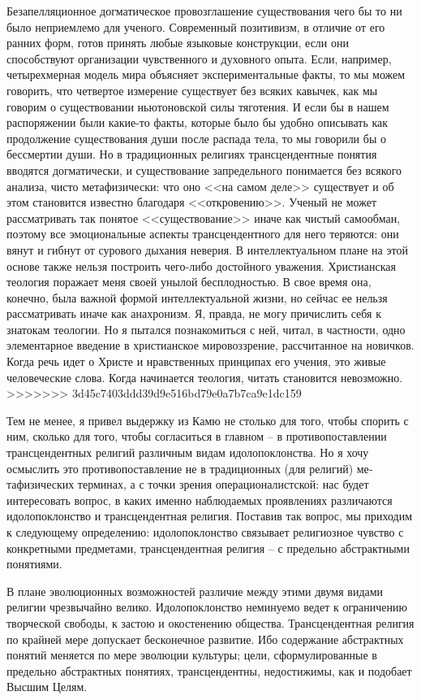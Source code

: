 \documentclass{book}
\begin{document}
Безапелляционное догматическое провозглашение существования чего бы то ни было неприемлемо для ученого. Современ­ный позитивизм, в отличие от его ранних форм, готов принять любые языковые конструкции, если они способствуют организации чувственного и духовного опыта. Если, например, четырехмерная модель мира объясняет экспериментальные факты, то мы можем говорить, что четвертое измерение существует без всяких кавычек, как мы говорим о существовании ньютоновской силы тяготения. И если бы в нашем распоряжении были какие-то факты, которые было бы удобно описывать как продолжение существования души после распада тела, то мы говорили бы о бессмертии души. Но в традиционных религиях трансцендентные понятия вводятся догматически, и существование запредельного понимается без всякого анализа, чисто метафизически: что оно <<на самом деле>> существует и об этом становится известно благодаря <<откровению>>. Уче­ный не может рассматривать так понятое <<существование>> иначе как чистый самообман, поэтому все эмоциональные 
ас­пекты трансцендентного для него теряются: они вянут и гибнут от сурового дыхания неверия. В интеллектуальном плане на этой основе также нельзя построить чего-либо достойного уважения. Христианская теология поражает меня своей уны­лой бесплодностью. В свое время она, конечно, была важной формой интеллектуальной жизни, но сейчас ее нельзя рассматривать иначе как анахронизм. Я, правда, не могу причислить себя к знатокам теологии. Но я пытался познакомиться с ней, читал, в частности, одно элементарное введение в христианское мировоззрение, рассчитанное на новичков. Когда речь идет о Христе и нравственных принципах его учения, это живые человеческие слова. Когда начинается теология, читать стано­вится невозможно.
>>>>>>> 3d45c7403ddd39d9e516bd79e0a7b7ca9e1dc159

Тем не менее, я привел выдержку из Камю не столько для того, чтобы спорить с ним, сколько для того, чтобы согласиться в главном -- в противопоставлении трансцендентных религий различным видам идолопоклонства. Но я хочу осмыслить это противопоставление не в традиционных (для религий) ме­тафизических терминах, а с точки зрения операционалистской: нас будет интересовать вопрос, в каких именно наблюдаемых проявлениях  различаются идолопоклонство и трансцендент­ная религия. Поставив так вопрос, мы приходим к следующему определению: идолопоклонство связывает религиозное чувст­во с конкретными предметами,  трансцендентная религия -- с предельно абстрактными понятиями. 

В плане эволюционных возможностей различие между этими двумя видами религии чрезвычайно велико. Идолопоклонство неминуемо ведет к ограничению творческой свободы, к застою и окостенению общества. Трансцендентная религия по край­ней мере допускает  бесконечное развитие. Ибо содержание аб­страктных понятий меняется по мере эволюции культуры; це­ли, сформулированные в предельно абстрактных понятиях, трансцендентны, недостижимы, как и подобает Высшим Целям.
\end{document}
